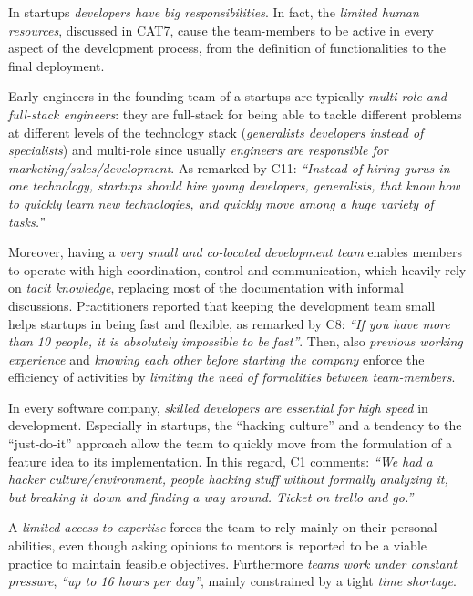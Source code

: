 \documentclass[10pt,journal,letterpaper,compsoc]{IEEEtran}
\begin{document}
In startups \textit{developers have big responsibilities}. In fact, the 
\textit{limited human resources}, discussed in CAT7, cause the team-members to 
be active in every aspect of the development process, from the definition of 
functionalities to the final deployment.

Early engineers in the founding team of a startups are typically 
\textit{multi-role and full-stack engineers}: they are full-stack for being able 
to tackle different problems at different levels of the technology stack 
(\textit{generalists developers instead of specialists}) and multi-role since 
usually \textit{engineers are responsible for marketing/sales/development}. As 
remarked by  C11: \textit{``Instead of hiring gurus in one technology, startups 
should hire young developers, generalists, that know how to quickly learn new 
technologies, and quickly move among a huge variety of tasks.''}

Moreover, having a \textit{very small and co-located development team} enables 
members to operate with high coordination, control and communication, which 
heavily rely on \textit{tacit knowledge},  replacing most of the documentation 
with informal discussions. Practitioners reported that keeping the development 
team small helps startups in being fast and flexible, as remarked by C8: 
\textit{``If you have more than 10 people, it is absolutely impossible to be 
fast''}. Then, also \textit{previous working experience} and \textit{knowing 
each other before starting the company} enforce the efficiency of activities by 
\textit{limiting the need of formalities between team-members}.

In every software company, \textit{skilled developers are essential for high 
speed} in development. Especially in startups, the ``hacking culture'' and a 
tendency to the ``just-do-it'' approach allow the team to quickly move from the 
formulation of a feature idea to its implementation. In this regard, C1 
comments: \textit{``We had a hacker culture/environment, people hacking stuff 
without formally analyzing it, but breaking it down and finding a way around. 
Ticket on trello and go.''}  

A \textit{limited access to expertise} forces the team to rely mainly on their 
personal abilities, even though asking opinions to mentors is reported to be a 
viable practice to maintain feasible objectives. Furthermore \textit{teams work 
under constant pressure}, \textit{``up to 16 hours per day''}, %
mainly constrained by a tight \textit{time shortage}.
\end{document}
